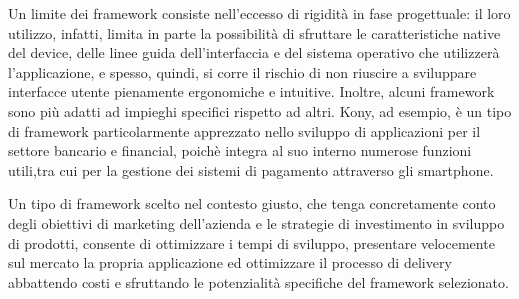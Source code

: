 Un limite dei framework consiste nell’eccesso di rigidità in fase progettuale: il loro utilizzo, infatti, limita in parte la possibilità di sfruttare le caratteristiche native del device, delle linee guida dell’interfaccia e del sistema operativo che utilizzerà l’applicazione, e spesso, quindi, si corre il rischio di non riuscire a sviluppare interfacce utente pienamente ergonomiche e intuitive.
Inoltre, alcuni framework sono più adatti ad impieghi specifici rispetto ad altri. Kony, ad esempio, è un tipo di framework particolarmente apprezzato nello sviluppo di applicazioni per il settore bancario e financial, poichè integra al suo interno numerose funzioni utili,tra cui per la gestione dei sistemi di pagamento attraverso gli smartphone.

Un tipo di framework scelto nel contesto giusto, che tenga concretamente conto degli obiettivi di marketing dell’azienda e le strategie di investimento in sviluppo di prodotti, consente di ottimizzare i tempi di sviluppo, presentare velocemente sul mercato la propria applicazione ed ottimizzare il processo di delivery abbattendo costi e sfruttando le potenzialità specifiche del framework selezionato.\\
\hspace*{\fill}\citep{web:framework}

